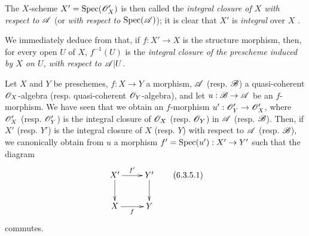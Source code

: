 The $X$-scheme $X'=\operatorname{Spec}(\mathscr{O}'_X)$ is then called the \emph{integral closure of $X$ with respect to $\mathscr{A}$} (or \emph{with respect to $\operatorname{Spec}(\mathscr{A})$});
it is clear that $X'$ is \emph{integral} over $X$ .

We immediately deduce from  that, if $f:X'\to X$ is the structure morphism, then, for every open $U$ of $X$, $f^{-1}(U)$ is the \emph{integral closure of the prescheme induced by $X$ on $U$, with respect to $\mathscr{A}|U$}.

\begin{env}[6.3.5]
\label{II.6.3.5}
Let $X$ and $Y$ be preschemes, $f:X\to Y$ a morphism, $\mathscr{A}$ (resp. $\mathscr{B}$) a quasi-coherent $\mathscr{O}_X$-algebra (resp. quasi-coherent $\mathscr{O}_Y$-algebra), and let $u:\sh{B}\to\sh{A}$ be an $f$-morphism.
We have seen  that we obtain an $f$-morphism $u':\sh{O}'_Y\to\sh{O}'_X$, where $\mathscr{O}'_X$ (resp. $\mathscr{O}'_Y$) is the integral closure of $\mathscr{O}_X$ (resp. $\mathscr{O}_Y$) in $\mathscr{A}$ (resp. $\mathscr{B}$).
Then, if $X'$ (resp. $Y'$) is the integral closure of $X$ (resp. $Y$) with respect to $\mathscr{A}$ (resp. $\mathscr{B}$), we canonically obtain from $u$ a morphism $f'=\Spec(u'):X'\to Y'$  such that the diagram
\[
\label{II.6.3.5.1}
  \xymatrix{
    X' \ar[r]^{f'} \ar[d]
    & Y' \ar[d]
  \\X \ar[r]_{f}
    & Y
  }
\tag{6.3.5.1}
\]
commutes.
\end{env}

